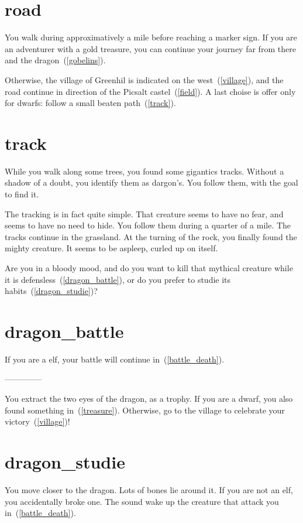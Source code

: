 \section{road}

You walk during approximatively a mile before reaching a marker sign. If you are
an adventurer with a gold treasure, you can continue your journey far from there and
the dragon~(\ref{gobelins}).

Otherwise, the village of Greenhil is indicated on the west~(\ref{village}), and
the road continue in direction of the Picsalt castel~(\ref{field}). A last
choise is offer only for dwarfs: follow a small beaten path~(\ref{track}).

\section{track}

While you walk along some trees, you found some gigantics tracks. Without a
shadow of a doubt, you identify them as dargon's. You follow them, with
the goal to find it.

The tracking is in fact quite simple. That creature seems to have no fear, and
seems to have no need to hide. You follow them during a quarter of a mile. The
tracks continue in the grassland. At the turning of the rock, you finally found
the mighty creature. It seems to be aspleep, curled up on itself.

Are you in a bloody mood, and do you want to kill that mythical creature while it
is defensless~(\ref{dragon_battle}), or do you prefer to studie its
habits~(\ref{dragon_studie})?

\section{dragon_battle}

If you are a elf, your battle will continue in~(\ref{battle_death}).

--------------


You extract the two eyes of the dragon, as a trophy. If you are a dwarf, you
also found something in~(\ref{treasure}). Otherwise, go to the village to
celebrate your victory~(\ref{village})!

\section{dragon_studie}

You move closer to the dragon. Lots of bones lie around it. If you are not an
elf, you accidentally broke one. The sound wake up the creature that attack you
in~(\ref{battle_death}).

